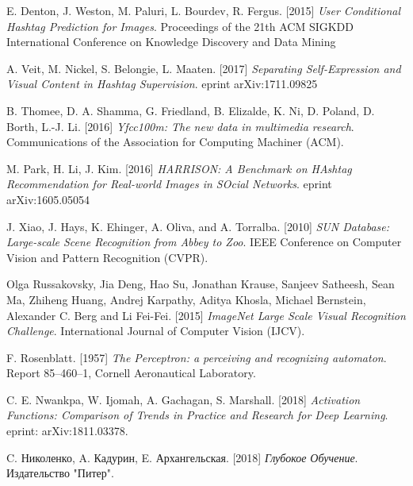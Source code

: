 \begin{thebibliography}{99}

	\bigskip
	
     E. Denton, J. Weston, M. Paluri, L. Bourdev, R. Fergus. [2015]
     \textit{User Conditional Hashtag Prediction for Images}.
     Proceedings of the 21th ACM SIGKDD International Conference 
     on Knowledge Discovery and Data Mining
     
      A. Veit, M. Nickel, S. Belongie, L. Maaten. [2017]
      \textit{Separating Self-Expression and Visual Content in Hashtag Supervision}.
      eprint arXiv:1711.09825
      
     B. Thomee, D. A. Shamma, G. Friedland, B. Elizalde, K. Ni,
     D. Poland, D. Borth, L.-J. Li. [2016]
     \textit{Yfcc100m: The new data in multimedia research}.
     Communications of the Association for Computing Machiner (ACM).
        
     M. Park, H. Li, J. Kim. [2016]
     \textit{HARRISON: A Benchmark on HAshtag Recommendation
     for Real-world Images in SOcial Networks}.
     eprint arXiv:1605.05054
     
	 J. Xiao, J. Hays, K. Ehinger, A. Oliva, and A. Torralba. [2010]
	 \textit{SUN Database: Large-scale Scene Recognition from Abbey to Zoo}.
	 IEEE Conference on Computer Vision and Pattern Recognition (CVPR).
     
     Olga Russakovsky, Jia Deng, Hao Su, Jonathan Krause, Sanjeev Satheesh, 
     Sean Ma, Zhiheng Huang, Andrej Karpathy, Aditya Khosla, Michael Bernstein, 
     Alexander C. Berg and Li Fei-Fei. [2015]
     \textit{ImageNet Large Scale Visual Recognition Challenge}. 
     International Journal of Computer Vision (IJCV).
     
     F. Rosenblatt. [1957]
     \textit{The Perceptron: a perceiving and recognizing automaton}.
     Report 85–460–1, Cornell Aeronautical Laboratory.
     
     C. E. Nwankpa, W. Ijomah, A. Gachagan, S. Marshall. [2018]
     \textit{Activation Functions: Comparison of Trends in
     Practice and Research for Deep Learning}.
     eprint: arXiv:1811.03378.
     
     C. Николенко, A. Кадурин, E. Архангельская. [2018]
     \textit{Глубокое Обучение}.
     Издательство "Питер".
     

\end{thebibliography}
